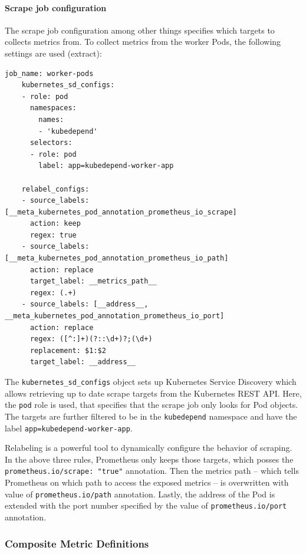 \paragraph{Scrape job configuration} The scrape job configuration among other things specifies which targets to collects metrics from. To collect metrics from the worker Pods, the following settings are used (extract):

\vspace{0.5cm}
\begin{minipage}{\linewidth}
	\begin{lstlisting}[caption={Prometheus scrape configuration for worker pods}, label={lst:worker-pods-scrape-job}]
	job_name: worker-pods
	kubernetes_sd_configs:
	- role: pod
	  namespaces:
	    names:
	    - 'kubedepend'
	  selectors:
	  - role: pod
	    label: app=kubedepend-worker-app
	
	relabel_configs:
	- source_labels: [__meta_kubernetes_pod_annotation_prometheus_io_scrape]
	  action: keep
	  regex: true
	- source_labels: [__meta_kubernetes_pod_annotation_prometheus_io_path]
	  action: replace
	  target_label: __metrics_path__
	  regex: (.+)
	- source_labels: [__address__, __meta_kubernetes_pod_annotation_prometheus_io_port]
	  action: replace
	  regex: ([^:]+)(?::\d+)?;(\d+)
	  replacement: $1:$2
	  target_label: __address__\end{lstlisting}
\end{minipage}

The \texttt{kubernetes\_sd\_configs} object sets up Kubernetes Service Discovery which allows retrieving up to date scrape targets from the Kubernetes REST API. Here, the \texttt{pod} role is used, that specifies that the scrape job only looks for Pod objects. The targets are further filtered to be in the \texttt{kubedepend} namespace and have the label \texttt{app=kubedepend-worker-app}.

Relabeling is a powerful tool to dynamically configure the behavior of scraping. In the above three rules, Prometheus only keeps those targets, which posses the \texttt{prometheus.io/scrape: "true"} annotation. Then the metrics path -- which tells Prometheus on which path to access the exposed metrics -- is overwritten with value of \texttt{prometheus.io/path} annotation. Lastly, the address of the Pod is extended with the port number specified by the value of \texttt{prometheus.io/port} annotation.

\subsubsection{Composite Metric Definitions}

